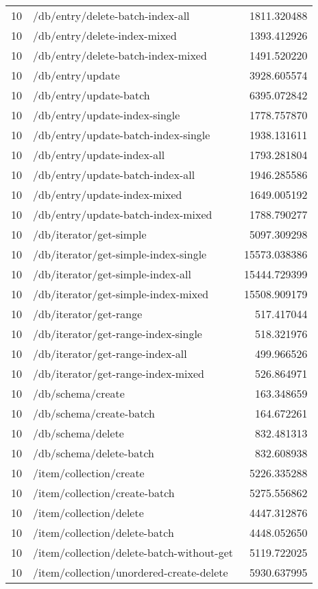 \begin{longtable}{rlr}
10 & /db/entry/delete-batch-index-all & 1811.320488 \\
10 & /db/entry/delete-index-mixed & 1393.412926 \\
10 & /db/entry/delete-batch-index-mixed & 1491.520220 \\
10 & /db/entry/update & 3928.605574 \\
10 & /db/entry/update-batch & 6395.072842 \\
10 & /db/entry/update-index-single & 1778.757870 \\
10 & /db/entry/update-batch-index-single & 1938.131611 \\
10 & /db/entry/update-index-all & 1793.281804 \\
10 & /db/entry/update-batch-index-all & 1946.285586 \\
10 & /db/entry/update-index-mixed & 1649.005192 \\
10 & /db/entry/update-batch-index-mixed & 1788.790277 \\
10 & /db/iterator/get-simple & 5097.309298 \\
10 & /db/iterator/get-simple-index-single & 15573.038386 \\
10 & /db/iterator/get-simple-index-all & 15444.729399 \\
10 & /db/iterator/get-simple-index-mixed & 15508.909179 \\
10 & /db/iterator/get-range & 517.417044 \\
10 & /db/iterator/get-range-index-single & 518.321976 \\
10 & /db/iterator/get-range-index-all & 499.966526 \\
10 & /db/iterator/get-range-index-mixed & 526.864971 \\
10 & /db/schema/create & 163.348659 \\
10 & /db/schema/create-batch & 164.672261 \\
10 & /db/schema/delete & 832.481313 \\
10 & /db/schema/delete-batch & 832.608938 \\
10 & /item/collection/create & 5226.335288 \\
10 & /item/collection/create-batch & 5275.556862 \\
10 & /item/collection/delete & 4447.312876 \\
10 & /item/collection/delete-batch & 4448.052650 \\
10 & /item/collection/delete-batch-without-get & 5119.722025 \\
10 & /item/collection/unordered-create-delete & 5930.637995 \\

\end{longtable}
